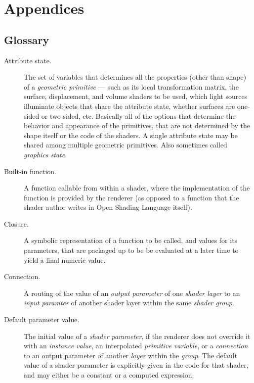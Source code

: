 \documentclass[11pt,letterpaper]{book}
\def\langname{Open Shading Language\xspace}
\begin{document}
\part{Appendices}
\begin{appendix}

%

%
%

\chapter{Glossary}
\label{chap:glossary}

\begin{description}

\item[Attribute state.] The set of variables that determines all the
  properties (other than shape) of a \emph{geometric primitive} --- such
  as its local transformation matrix, the surface, displacement, and
  volume shaders to be used, which light sources illuminate objects that
  share the attribute state, whether surfaces are one-sided or
  two-sided, etc.  Basically all of the options that determine the
  behavior and appearance of the primitives, that are not determined by
  the shape itself or the code of the shaders.  A single attribute state
  may be shared among multiple geometric primitives.  Also sometimes
  called \emph{graphics state}.

\item[Built-in function.] A function callable from within a shader, where
  the implementation of the function is provided by the renderer (as
  opposed to a function that the shader author writes in \langname
  itself).

\item[Closure.] A symbolic representation of a function to be called,
  and values for its parameters, that are packaged up to be be evaluated
  at a later time to yield a final numeric value.

\item[Connection.] A routing of the value of an \emph{output parameter}
  of one \emph{shader layer} to an \emph{input paramter} of another
  shader layer within the same \emph{shader group}.

\item[Default parameter value.] The initial value of a \emph{shader
  parameter}, if the renderer does not override it with an
  \emph{instance value}, an interpolated \emph{primitive variable}, or a
  \emph{connection} to an output parameter of another \emph{layer}
  within the \emph{group}.  The default value of a shader parameter
  is explicitly given in the code for that shader, and may either be
  a constant or a computed expression.


\end{description}
\end{appendix}
\end{document}
